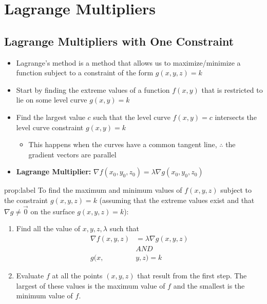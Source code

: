 \documentclass{package/notes}
\begin{document}
\section{Lagrange Multipliers}


\subsection{Lagrange Multipliers with One Constraint}

\begin{itemize}
	\item Lagrange's method is a method that allows us to maximize/minimize a function subject to a constraint of the form $g(x,y,z) = k$
	\item Start by finding the extreme values of a function $f(x,y)$ that is restricted to lie on some level curve $g(x,y) = k$
	\item Find the largest value $c$ such that the level curve $f(x,y) = c$ intersects the level curve constraint $g(x,y) = k$
	\begin{itemize}
		\item This happens when the curves have a common tangent line, $\therefore$ the gradient vectors are parallel
	\end{itemize}
	\item \textbf{Lagrange Multiplier:} $\nabla f(x_0,y_0,z_0)=\lambda \nabla g(x_0,y_0,z_0)$
\end{itemize}

\begin{proposition}{prop:label}
	To find the maximum and minimum values of $f(x,y,z)$ subject to the constraint $g(x,y,z) = k$ (assuming that the extreme values exist and that $\nabla g \ne \vec 0$ on the surface $g(x,y,z) = k$):

	\begin{enumerate}
		\item Find all the value of $x,y,z,\lambda$ such that
		$$
		\begin{aligned}
			\nabla f(x,y,z) &= \lambda \nabla g(x,y,z)\\
			&AND\\
			g(x,&y,z)=k
		\end{aligned}
		$$
		\item Evaluate $f$ at all the points $(x,y,z)$ that result from the first step. The largest of these values is the maximum value of $f$ and the smallest is the minimum value of $f$.
	\end{enumerate}
\end{proposition}
\end{document}
